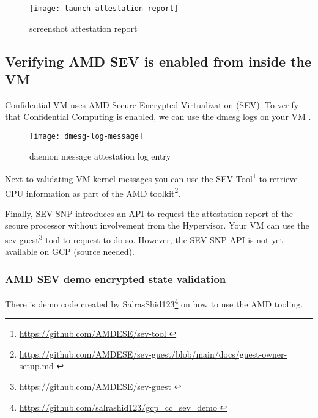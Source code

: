 \begin{figure}[!ht]
    \centering
    \texttt{[image: launch-attestation-report]}
    \caption{screenshot attestation report}
    \label{fig:launch-attestation-report}
\end{figure}


\subsection{Verifying AMD SEV is enabled from inside the VM }
Confidential VM uses AMD Secure Encrypted Virtualization (SEV). 
To verify that Confidential Computing is enabled, 
we can use the dmesg logs on your VM 
\citep{marsden_using_2019}. 

\begin{figure}[!ht]
    \centering
    \texttt{[image: dmesg-log-message]}
    \caption{daemon message attestation log entry}
    \label{fig:dmesg-log-message}
\end{figure}

Next to validating VM kernel messages you can use the 
SEV-Tool\footnote{\url{https://github.com/AMDESE/sev-tool  }} 
to retrieve CPU information as part of the 
AMD toolkit\footnote{\url{https://github.com/AMDESE/sev-guest/blob/main/docs/guest-owner-setup.md }}.

Finally, 
SEV-SNP introduces an API to request the attestation report 
of the secure processor without involvement from the Hypervisor. 
Your VM can use the sev-guest\footnote{\url{https://github.com/AMDESE/sev-guest }} 
tool to request to do so. 
However, the SEV-SNP API is not yet available on GCP (source needed).

\subsubsection{AMD SEV demo encrypted state validation}
There is demo code created by SalrasShid123\footnote{\url{https://github.com/salrashid123/gcp_cc_sev_demo }} on how to use the AMD tooling. 